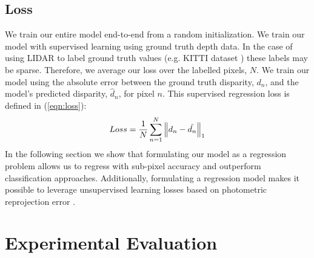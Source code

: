 \subsection{Loss}

We train our entire model end-to-end from a random initialization. We train our model with supervised learning using ground truth depth data. In the case of using LIDAR to label ground truth values (e.g. KITTI dataset \citep{Geiger2012CVPR,Menze2015CVPR}) these labels may be sparse. Therefore, we average our loss over the labelled pixels, $N$. We train our model using the absolute error between the ground truth disparity, $d_n$, and the model's predicted disparity, $\hat{d}_n$, for pixel $n$. This supervised regression loss is defined in (\ref{eqn:loss}):
\begin{equation}
\label{eqn:loss}
Loss = \frac{1}{N} \sum\limits_{n=1}^N \left\lVert {d_n}-\hat{d_n} \right\rVert_1
\end{equation}
In the following section we show that formulating our model as a regression problem allows us to regress with sub-pixel accuracy and outperform classification approaches. Additionally, formulating a regression model makes it possible to leverage unsupervised learning losses based on photometric reprojection error \citep{garg2016unsupervised}.

\section{Experimental Evaluation}
\label{section:evaluation}

